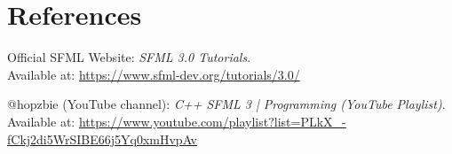 \section{References}
\begin{thebibliography}{}

    Official SFML Website: \textit{SFML 3.0 Tutorials}.\\ Available at: \url{https://www.sfml-dev.org/tutorials/3.0/}

    @hopzbie (YouTube channel): \textit{C++  SFML 3 | Programming (YouTube Playlist)}. Available at: \url{https://www.youtube.com/playlist?list=PLkX_-fCkj2di5WrSIBE66j5Yq0xmHvpAv}

\end{thebibliography}
